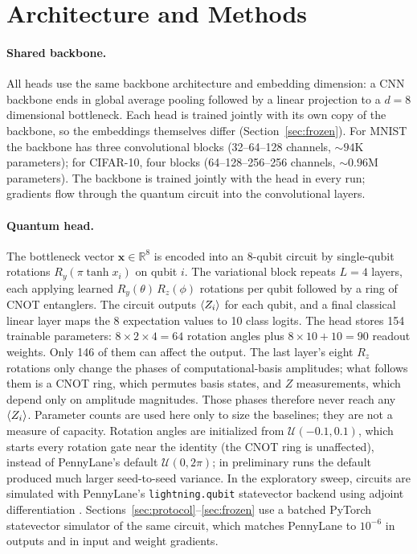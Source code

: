 \documentclass[10pt]{article}
\begin{document}
\section{Architecture and Methods}
\label{sec:methods}

\paragraph{Shared backbone.}
All heads use the same backbone architecture and embedding dimension: a CNN
backbone ends in global average pooling followed by a linear projection to a
$d=8$ dimensional bottleneck. Each head is trained jointly with its own copy of
the backbone, so the embeddings themselves differ (Section~\ref{sec:frozen}). For
MNIST the backbone has three convolutional blocks (32--64--128 channels,
${\sim}94$K parameters); for CIFAR-10, four blocks (64--128--256--256
channels, ${\sim}0.96$M parameters). The backbone is trained jointly with the
head in every run; gradients flow through the quantum circuit into the
convolutional layers.

\paragraph{Quantum head.}
The bottleneck vector $\mathbf{x} \in \mathbb{R}^8$ is encoded into an 8-qubit
circuit by single-qubit rotations $R_y\!\left(\pi \tanh x_i\right)$ on qubit
$i$. The variational block repeats $L=4$ layers, each applying learned
$R_y(\theta)\,R_z(\phi)$ rotations per qubit followed by a ring of CNOT
entanglers. The circuit outputs $\braket{Z_i}$ for each qubit, and a final
classical linear layer maps the 8 expectation values to 10 class logits. The
head stores 154 trainable parameters: $8 \times 2 \times 4 = 64$ rotation
angles plus $8 \times 10 + 10 = 90$ readout weights. Only 146 of them can
affect the output. The last layer's eight $R_z$ rotations only change the
phases of computational-basis amplitudes; what follows them is a CNOT ring,
which permutes basis states, and $Z$ measurements, which depend only on
amplitude magnitudes. Those phases therefore never reach any $\braket{Z_i}$. Parameter counts are used here only to
size the baselines; they are not a measure of capacity. Rotation angles are
initialized from $\mathcal{U}(-0.1, 0.1)$, which starts every rotation gate
near the identity (the CNOT ring is unaffected), instead of PennyLane's default $\mathcal{U}(0, 2\pi)$; in
preliminary runs the default produced much larger seed-to-seed variance.
In the exploratory sweep, circuits are simulated with PennyLane's
\texttt{lightning.qubit} statevector backend using adjoint differentiation
\citep{bergholm2018pennylane}. Sections~\ref{sec:protocol}--\ref{sec:frozen}
use a batched PyTorch statevector simulator of the same circuit, which matches
PennyLane to $10^{-6}$ in outputs and in input and weight gradients.
\end{document}
